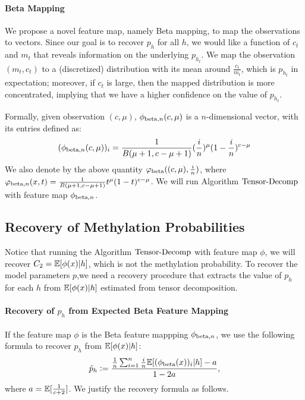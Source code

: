 \paragraph{Beta Mapping} We propose a novel feature map, namely Beta mapping, to map the observations to vectors. Since our goal is to recover $p_h$ for all $h$, we would like a function of $c_t$ and $m_t$ that reveals information on the underlying $p_{h_t}$. We map the observation $(m_t, c_t)$ to a (discretized) distribution with its mean around $\frac{c_t}{m_t}$, which is $p_{h_t}$ in expectation; moreover, if $c_t$ is large, then the mapped distribution is more concentrated, implying that we have a higher confidence on the value of $p_{h_t}$.

Formally, given observation $(c, \mu)$, $\phi_{\text{beta}, n}(c, \mu)$ is a $n$-dimensional vector, with its entries defined as:
\[ (\phi_{\text{beta}, n}(c, \mu))_i = \frac{1}{B(\mu+1, c-\mu+1)} (\frac{i}{n})^\mu (1-\frac{i}{n})^{c-\mu} \]
We also denote by the above quantity $\varphi_{\text{beta}}((c,\mu), \frac{i}{n})$, where $\varphi_{\text{beta}, n}(x, t) = \frac{1}{B(\mu+1, c-\mu+1)} t^\mu (1-t)^{c-\mu}$.
We will run Algorithm $\text{Tensor-Decomp}$ with feature map $\phi_{\text{beta}, n}$.


\subsection{Recovery of Methylation Probabilities}
Notice that running the Algorithm $\text{Tensor-Decomp}$ with feature map $\phi$, we will recover $C_2 = \mathbb{E}[\phi(x)|h]$, which is not the methylation probability. To recover the model parameters $p$,we need a recovery procedure that extracts the value of $p_h$ for each $h$ from $\mathbb{E}[\phi(x)|h]$ estimated from tensor decomposition.

\paragraph{Recovery of $p_h$ from Expected Beta Feature Mapping} If the feature map $\phi$ is the Beta feature mappping $\phi_{\text{beta}, n}$, we use the following formula to recover $p_h$ from $\mathbb{E}[\phi(x)|h]$:
\[ \hat{p}_h := \frac{\frac{1}{n} \sum_{i=1}^n \frac{i}{n} \mathbb{E}[(\phi_{\text{beta}}(x))_i | h] - a}{1 - 2 a}, \]
where $a = \mathbb{E}[\frac{1}{c+2}]$. We justify the recovery formula as follows.


